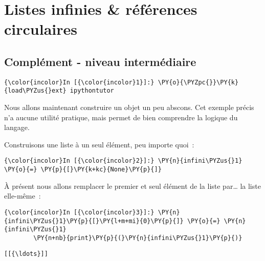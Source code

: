     
    
    
    

    

    \hypertarget{listes-infinies-ruxe9fuxe9rences-circulaires}{%
\section{Listes infinies \& références
circulaires}\label{listes-infinies-ruxe9fuxe9rences-circulaires}}

    \hypertarget{compluxe9ment---niveau-intermuxe9diaire}{%
\subsection{Complément - niveau
intermédiaire}\label{compluxe9ment---niveau-intermuxe9diaire}}

    \begin{Verbatim}[commandchars=\\\{\},frame=single,framerule=0.3mm,rulecolor=\color{cellframecolor}]
{\color{incolor}In [{\color{incolor}1}]:} \PY{o}{\PYZpc{}}\PY{k}{load\PYZus{}ext} ipythontutor
\end{Verbatim}


    Nous allons maintenant construire un objet un peu abscons. Cet exemple
précis n'a aucune utilité pratique, mais permet de bien comprendre la
logique du langage.

    Construisons une liste à un seul élément, peu importe quoi~:

    \begin{Verbatim}[commandchars=\\\{\},frame=single,framerule=0.3mm,rulecolor=\color{cellframecolor}]
{\color{incolor}In [{\color{incolor}2}]:} \PY{n}{infini\PYZus{}1} \PY{o}{=} \PY{p}{[}\PY{k+kc}{None}\PY{p}{]}
\end{Verbatim}


    À présent nous allons remplacer le premier et seul élément de la liste
par\ldots{} la liste elle-même~:

    \begin{Verbatim}[commandchars=\\\{\},frame=single,framerule=0.3mm,rulecolor=\color{cellframecolor}]
{\color{incolor}In [{\color{incolor}3}]:} \PY{n}{infini\PYZus{}1}\PY{p}{[}\PY{l+m+mi}{0}\PY{p}{]} \PY{o}{=} \PY{n}{infini\PYZus{}1}
        \PY{n+nb}{print}\PY{p}{(}\PY{n}{infini\PYZus{}1}\PY{p}{)}
\end{Verbatim}


    \begin{Verbatim}[commandchars=\\\{\},frame=single,framerule=0.3mm,rulecolor=\color{cellframecolor}]
[[{\ldots}]]
\end{Verbatim}

